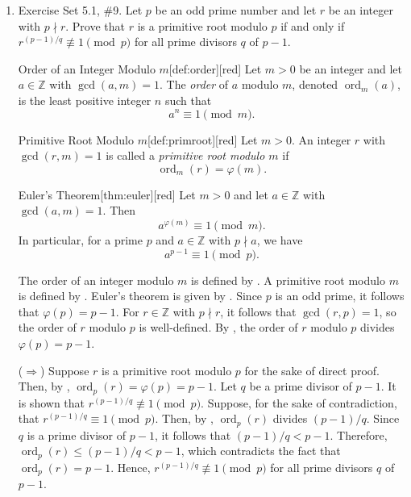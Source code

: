 \newpage
\begin{enumerate}
  \item Exercise Set 5.1, \#9. Let $p$ be an odd prime number and let $r$ be an integer with $p \nmid r$. 
  Prove that $r$ is a primitive root modulo $p$ if and only if $r^{(p-1)/q} \not\equiv 1 \pmod{p}$ 
  for all prime divisors $q$ of $p-1$.
  \begin{define}{Order of an Integer Modulo $m$}[def:order][red]
  Let $m>0$ be an integer and let $a\in\mathbb{Z}$ with $\gcd(a,m)=1$. The \emph{order} of $a$ modulo $m$, denoted $\operatorname{ord}_m(a)$, is the least positive integer $n$ such that
  \[
  a^n\equiv 1 \pmod m.
  \]
  \end{define}
  \begin{define}{Primitive Root Modulo $m$}[def:primroot][red]
  Let $m>0$. An integer $r$ with $\gcd(r,m)=1$ is called a \emph{primitive root modulo $m$} if
  \[
  \operatorname{ord}_m(r)=\varphi(m).
  \]
  \end{define}
  \begin{define}{Euler's Theorem}[thm:euler][red]
  Let $m>0$ and let $a\in\mathbb{Z}$ with $\gcd(a,m)=1$. Then
  \[
  a^{\varphi(m)}\equiv 1 \pmod{m}.
  \]
  In particular, for a prime $p$ and $a\in\mathbb{Z}$ with $p\nmid a$, we have
  \[
  a^{p-1}\equiv 1 \pmod{p}.
  \]
  \end{define}
  \begin{subprove}
    The order of an integer modulo $m$ is defined by .
    A primitive root modulo $m$ is defined by .
    Euler's theorem is given by .
    Since $p$ is an odd prime, it follows that $\varphi(p) = p-1$.
    For $r \in \mathbb{Z}$ with $p \nmid r$, it follows that $\gcd(r, p) = 1$, so the order of $r$ modulo $p$ is well-defined.
    By , the order of $r$ modulo $p$ divides $\varphi(p) = p-1$.
    
    ($\Rightarrow$) Suppose $r$ is a primitive root modulo $p$ for the sake of direct proof.
    Then, by , $\operatorname{ord}_p(r) = \varphi(p) = p-1$.
    Let $q$ be a prime divisor of $p-1$. It is shown that $r^{(p-1)/q} \not\equiv 1 \pmod{p}$.
    Suppose, for the sake of contradiction, that $r^{(p-1)/q} \equiv 1 \pmod{p}$.
    Then, by , $\operatorname{ord}_p(r)$ divides $(p-1)/q$.
    Since $q$ is a prime divisor of $p-1$, it follows that $(p-1)/q < p-1$.
    Therefore, $\operatorname{ord}_p(r) \leq (p-1)/q < p-1$, which contradicts the fact that $\operatorname{ord}_p(r) = p-1$.
    Hence, $r^{(p-1)/q} \not\equiv 1 \pmod{p}$ for all prime divisors $q$ of $p-1$.
    

\end{subprove}
\end{enumerate}
